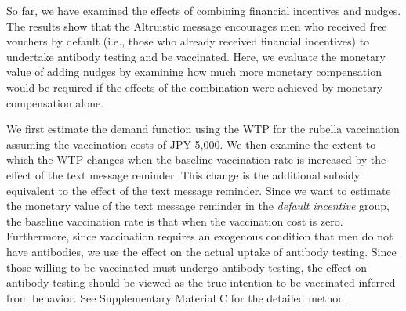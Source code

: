 \documentclass[
  11pt,
  a4paper
]{article}
\begin{document}
So far, we have examined the effects of combining financial incentives and nudges. The results show that the Altruistic message encourages men who received free vouchers by default (i.e., those who already received financial incentives) to undertake antibody testing and be vaccinated. Here, we evaluate the monetary value of adding nudges by examining how much more monetary compensation would be required if the effects of the combination were achieved by monetary compensation alone.

We first estimate the demand function using the WTP for the rubella vaccination assuming the vaccination costs of JPY 5,000. We then examine the extent to which the WTP changes when the baseline vaccination rate is increased by the effect of the text message reminder. This change is the additional subsidy equivalent to the effect of the text message reminder. Since we want to estimate the monetary value of the text message reminder in the \emph{default incentive} group, the baseline vaccination rate is that when the vaccination cost is zero. Furthermore, since vaccination requires an exogenous condition that men do not have antibodies, we use the effect on the actual uptake of antibody testing. Since those willing to be vaccinated must undergo antibody testing, the effect on antibody testing should be viewed as the true intention to be vaccinated inferred from behavior. See Supplementary Material C for the detailed method.
\end{document}
